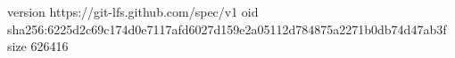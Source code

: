version https://git-lfs.github.com/spec/v1
oid sha256:6225d2c69c174d0e7117afd6027d159e2a05112d784875a2271b0db74d47ab3f
size 626416
